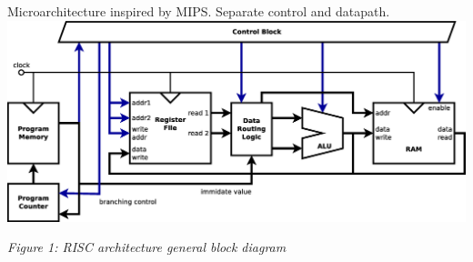 \documentclass[portrait,color=UCLmidgreen,margin=1.5cm,bannerheight=8cm,logoheight=3.5cm]{uclposter}
\begin{document}
\begin{multicols}{2}

\begin{tcolorbox}[title=RISC Architecture]
	Microarchitecture inspired by MIPS. Separate control and datapath.\\[5mm]
	\includegraphics[width=\linewidth]{../resources/risc.eps}
	\begin{center}
	\textit{Figure 1: RISC architecture general block diagram}
	\end{center}
	

\end{tcolorbox}
\end{multicols}
\end{document}
